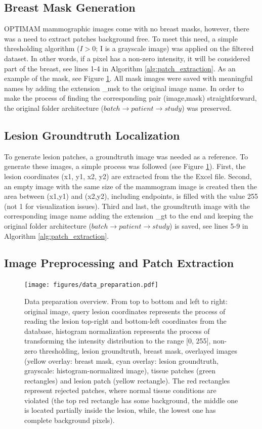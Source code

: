 \documentclass[final,3p,twocolumn,authoryear,sort&compress,times]{maia}
\begin{document}
\subsection{Breast Mask Generation}
\label{sec:mask_generation}
OPTIMAM mammographic images come with no breast masks, however, there was a need to extract patches background free. To meet this need, a simple thresholding algorithm ($I > 0$; I is a grayscale image) was applied on the filtered dataset. In other words, if a pixel has a non-zero intensity, it will be considered part of the breast, see lines 1-4 in Algorithm \ref{alg:patch_extraction}. As an example of the mask, see Figure \ref{fig:data_preparation}. All mask images were saved with meaningful names by adding the extension \_msk to the original image name. In order to make the process of finding the corresponding pair (image,mask) straightforward, the original folder architecture ($batch \to patient \to study$) was preserved.

\subsection{Lesion Groundtruth Localization}
\label{sec:gt_localization}
To generate lesion patches, a groundtruth image was needed as a reference. To generate these images, a simple process was followed (see Figure \ref{fig:data_preparation}). First, the lesion coordinates (x1, y1, x2, y2) are extracted from the the Excel file. Second, an empty image with the same size of the mammogram image is created then the area between (x1,y1) and (x2,y2), including endpoints, is filled with the value 255 (not 1 for visualization issues).
Third and last, the groundtruth image with the corresponding image name adding the extension \_gt to the end and keeping the original folder architecture ($batch \to patient \to study$) is saved, see lines 5-9 in Algorithm \ref{alg:patch_extraction}.


\subsection{Image Preprocessing and Patch Extraction}
\label{sec:patch_extraction}

\begin{figure}[htp]
    \centering
    \texttt{[image: figures/data\_preparation.pdf]}
    \caption{Data preparation overview. From top to bottom and left to right: original image, query lesion coordinates represents the process of reading the lesion top-right and bottom-left coordinates from the database, histogram normalization represents the process of transforming the intensity distribution to the range [0, 255], non-zero thresholding, lesion groundtruth, breast mask, overlayed images (yellow overlay: breast mask, cyan overlay: lesion groundtruth, grayscale: histogram-normalized image), tissue patches (green rectangles) and lesion patch (yellow rectangle). The red rectangles represent rejected patches, where normal tissue conditions are violated (the top red rectangle has some background, the middle one is located partially inside the lesion, while, the lowest one has complete background pixels).}
    \label{fig:data_preparation}
\end{figure}
\end{document}
